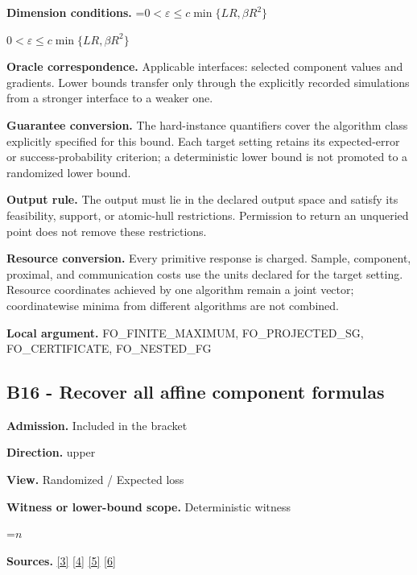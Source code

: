 \documentclass[10pt,a4paper]{article}
\newcommand{\AtlasMath}[1]{\par\begingroup\centering\setbox0=\hbox{$\displaystyle #1$}\ifdim\wd0>1.4\linewidth\typeout{ATLAS WIDE FORMULA: \the\wd0}\fi\ifdim\wd0>\linewidth\resizebox{\linewidth}{!}{\box0}\else\box0\fi\par\endgroup}
\newcommand{\AtlasInlineMath}[1]{\begingroup\setbox0=\hbox{$#1$}\ifdim\wd0>.4\linewidth\endgroup\AtlasMath{#1}\else\endgroup$#1$\fi}
\begin{document}
\textbf{Dimension conditions.} \AtlasInlineMath{0<\varepsilon\le c\min\{LR,\beta R^2\}}



\textbf{Oracle correspondence.} Applicable interfaces: selected component values and gradients. Lower bounds transfer only through the explicitly recorded simulations from a stronger interface to a weaker one.



\textbf{Guarantee conversion.} The hard-instance quantifiers cover the algorithm class explicitly specified for this bound. Each target setting retains its expected-error or success-probability criterion; a deterministic lower bound is not promoted to a randomized lower bound.



\textbf{Output rule.} The output must lie in the declared output space and satisfy its feasibility, support, or atomic-hull restrictions. Permission to return an unqueried point does not remove these restrictions.



\textbf{Resource conversion.} Every primitive response is charged. Sample, component, proximal, and communication costs use the units declared for the target setting. Resource coordinates achieved by one algorithm remain a joint vector; coordinatewise minima from different algorithms are not combined.



\textbf{Local argument.} FO\_FINITE\_MAXIMUM, FO\_PROJECTED\_SG, FO\_CERTIFICATE, FO\_NESTED\_FG



\subsection{B16 - Recover all affine component formulas}


\textbf{Admission.} Included in the bracket



\textbf{Direction.} upper



\textbf{View.} Randomized / Expected loss



\textbf{Witness or lower-bound scope.} Deterministic witness



\AtlasMath{n}


\textbf{Sources.} \href{https://arxiv.org/pdf/2311.10886}{[3]} \href{https://arxiv.org/pdf/1405.4980}{[4]} \href{https://www2.isye.gatech.edu/~nemirovs/MOR_AccuracyCertificates.pdf}{[5]} \href{https://arxiv.org/pdf/2609.20701}{[6]}
\end{document}

